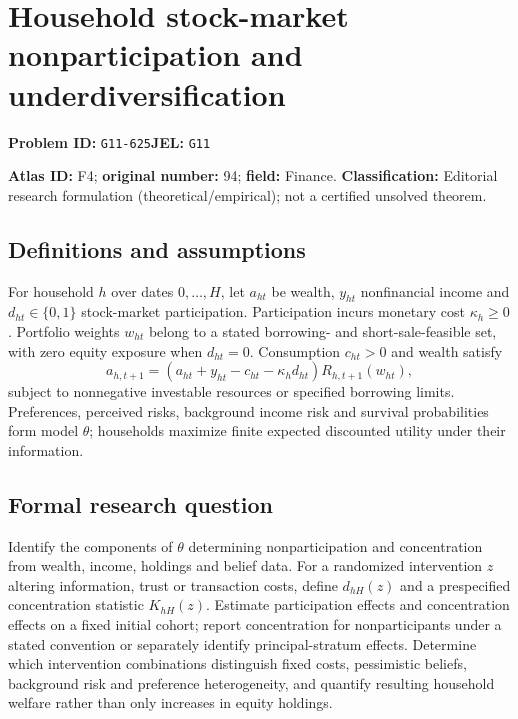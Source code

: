 \documentclass[11pt,a4paper]{article}
\begin{document}
\section*{Household stock-market nonparticipation and underdiversification}
\textbf{Problem ID:} \texttt{G11-625}\quad \textbf{JEL:} \texttt{G11}\par
\label{problem:OP-0094}
\label{atlas:prob:F4}

\noindent\textbf{Atlas ID:} F4; \textbf{original number:} 94; \textbf{field:} Finance. \textbf{Classification:} Editorial research formulation (theoretical/empirical); not a certified unsolved theorem.

\subsection*{Definitions and assumptions}
For household $h$ over dates $0,\ldots,H$, let $a_{ht}$ be wealth, $y_{ht}$ nonfinancial income and $d_{ht}\in\{0,1\}$ stock-market participation. Participation incurs monetary cost $\kappa_h\ge0$. Portfolio weights $w_{ht}$ belong to a stated borrowing- and short-sale-feasible set, with zero equity exposure when $d_{ht}=0$. Consumption $c_{ht}>0$ and wealth satisfy
\[
 a_{h,t+1}=(a_{ht}+y_{ht}-c_{ht}-\kappa_hd_{ht})R_{h,t+1}(w_{ht}),
\]
subject to nonnegative investable resources or specified borrowing limits. Preferences, perceived risks, background income risk and survival probabilities form model $\theta$; households maximize finite expected discounted utility under their information.

\subsection*{Formal research question}
Identify the components of $\theta$ determining nonparticipation and concentration from wealth, income, holdings and belief data. For a randomized intervention $z$ altering information, trust or transaction costs, define $d_{hH}(z)$ and a prespecified concentration statistic $K_{hH}(z)$. Estimate participation effects and concentration effects on a fixed initial cohort; report concentration for nonparticipants under a stated convention or separately identify principal-stratum effects. Determine which intervention combinations distinguish fixed costs, pessimistic beliefs, background risk and preference heterogeneity, and quantify resulting household welfare rather than only increases in equity holdings.
\end{document}
